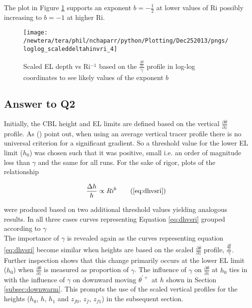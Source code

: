 The plot in Figure \ref{fig:loglogdeltahinvri} supports an exponent $b = -\frac{1}{2}$ at lower values of \acs{Ri} possibly increasing to $b = -1$ at higher \acs{Ri}.\\    

\begin{figure}[htbp]
\centering
\texttt{[image: /newtera/tera/phil/nchaparr/python/Plotting/Dec252013/pngs/loglog\_scaleddeltahinvri\_4]}\\
\caption[Log-log plot of scaled \acs{EL} depth vs \acs{Ri}$^{-1}$]{Scaled \acs{EL} depth vs \acs{Ri}$^{-1}$ based on the $\frac{\frac{\partial \overline{\theta}}{\partial z}}{\gamma}$ profile in log-log coordinates to see likely values of the exponent $b$}
\label{fig:loglogdeltahinvri}
\end{figure}

\subsection{Answer to Q2}

Initially, the \acs{CBL} height and \acs{EL} limits are defined based on the vertical  $\frac{\partial \overline{\theta}}{\partial z}$ profile.  As \citeauthor{BrooksFowler2} (\citeyear{BrooksFowler2}) point out, when using an average vertical tracer profile there is no universal criterion for a significant gradient.  So a threshold value for the lower \acs{EL} limit ($h_{0}$) was chosen such that it was positive, small i.e. an order of magnitude less than $\gamma$ and the same for all runs.  For the sake of rigor, plots of the relationship

\begin{equation}
\frac{\Delta h}{h} \propto Ri ^{b} \tag{\ref{eq:dhvsri}}
\end{equation}

were produced based on two additional threshold values yielding analogous results.  In all three cases curves representing Equation \ref{eq:dhvsri} grouped according to $\gamma$\\

The importance of $\gamma$ is revealed again as the curves representing equation \ref{eq:dhvsri} become similar when heights are based on the scaled $\frac{\partial \overline{\theta}}{\partial z}$ profile, $\frac{\frac{\partial \overline{\theta}}{\partial z}}{\gamma}$. Further inspection shows that this change primarily occurs at the lower \acs{EL} limit ($h_{0}$) when $\frac{\partial \overline{\theta}}{\partial z}$ is measured as proportion of $\gamma$. The influence of $\gamma$ on $\frac{\partial \overline{\theta}}{\partial z}$ at $h_{0}$ ties in with the influence of $\gamma$ on downward moving $\theta^{'+}$ at $h$ shown in Section \ref{subsec:downwarm}.  This prompts the use of the scaled vertical profiles for the heights ($h_{0}$, $h$, $h_{1}$ and $z_{f0}$, $z_{f}$, $z_{f1}$) in the subsequent section.\\

